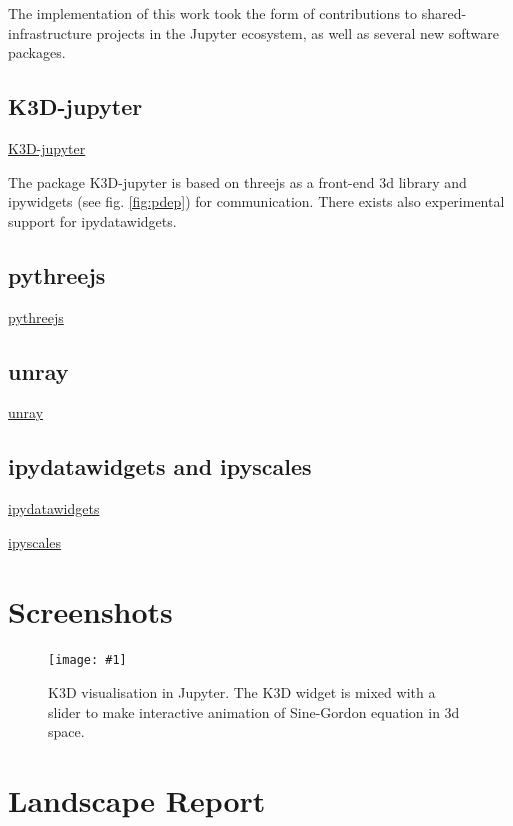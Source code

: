 \documentclass{deliverablereport}
\begin{document}
The implementation of this work took the form of contributions to shared-infrastructure projects in the Jupyter ecosystem, as well as several new software packages.

\subsection{K3D-jupyter}

\href{https://github.com/K3D-tools/K3D-jupyter}{K3D-jupyter}

The package K3D-jupyter is based on threejs as a front-end 3d library
and ipywidgets (see fig. \ref{fig:pdep}) for communication.  There exists also
experimental support for ipydatawidgets. 



\subsection{pythreejs}

\href{https://github.com/jupyter-widgets/pythreejs}{pythreejs}

\subsection{unray}

\href{https://github.com/vidartf/unray}{unray}

\subsection{ipydatawidgets and ipyscales}

\href{https://github.com/vidartf/ipydatawidgets}{ipydatawidgets}

\href{https://github.com/vidartf/ipyscales}{ipyscales}




\appendix
\section{Screenshots}\label{screenshots}

\newcommand{\screenshot}[2]{
\begin{figure}[ht]
  \texttt{[image: \#1]}
  \caption{#2}
\end{figure}}


\screenshot{k3d_3.png}{K3D visualisation in Jupyter. The K3D widget is
  mixed with a slider to make interactive animation of Sine-Gordon
  equation in 3d space.}

\clearpage
\section{Landscape Report}\label{landscape}

\end{document}
